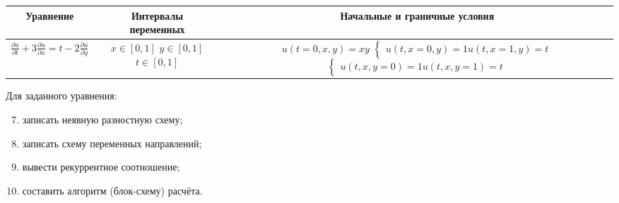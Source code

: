 \documentclass[12pt, a4paper]{report}
\begin{document}
	\begin{center}
		\begin{tabular}{||c|c|c||}
			\hline
			Уравнение & \makecell{Интервалы \\ переменных} & Начальные и граничные условия \\

			\hline
			$ \frac{\partial u}{\partial t} + 3\frac{\partial u}{\partial x} = t - 2\frac{\partial u}{\partial y} $ & \makecell{$ x \in [0, 1] $ \\ $ y \in [0, 1] $ \\ $ t \in [0, 1] $} & \makecell{$ u(t = 0, x, y) = xy $ \\ $ \begin{cases} u(t, x = 0, y) = 1 \\ u(t, x = 1, y) = t \end{cases}$ \\ $ \begin{cases} u(t, x, y = 0) = 1 \\ u(t, x, y = 1) = t \end{cases} $} \\

			\hline
		\end{tabular}
	\end{center}
	\par
	Для заданного уравнения:
	\begin{enumerate}
		\setcounter{enumi}{6}
		\item записать неявную разностную схему;
		\item записать схему переменных направлений;
		\item вывести рекуррентное соотношение;
		\item составить алгоритм (блок-схему) расчёта.
	\end{enumerate}
	
\end{document}
